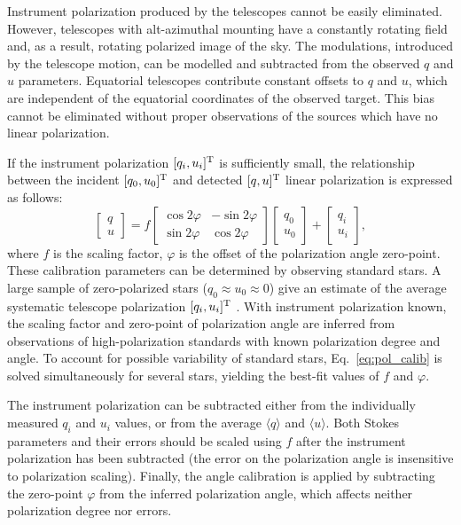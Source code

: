 Instrument polarization produced by the telescopes cannot be easily eliminated.
However, telescopes with alt-azimuthal mounting have a constantly rotating field and, as a result, rotating polarized image of the sky.
The modulations, introduced by the telescope motion, can be modelled and subtracted from the observed $q$ and $u$ parameters.
Equatorial telescopes contribute constant offsets to $q$ and $u$, which are independent of the equatorial coordinates of the observed target.
This bias cannot be eliminated without proper observations of the sources which have no linear polarization.

If the instrument polarization $[q_i, u_i]^{\mathrm{T}}$ is sufficiently small, the relationship between the incident $[q_0, u_0]^{\mathrm{T}}$ and detected $[q, u]^{\mathrm{T}}$  linear polarization is expressed as follows:
\begin{equation}
    \label{eq:pol_calib}
    \begin{bmatrix}
        q\\u
    \end{bmatrix} = f
    \begin{bmatrix}
        \cos 2\varphi & -\sin 2\varphi \\
        \sin 2\varphi & \cos 2\varphi
    \end{bmatrix}
    \begin{bmatrix}
        q_0\\ u_0
    \end{bmatrix} +
    \begin{bmatrix}
        q_i \\ u_i
    \end{bmatrix},
\end{equation}
where $f$ is the scaling factor, $\varphi$ is the offset of the polarization angle zero-point.
These calibration parameters can be determined by observing standard stars.
A large sample of zero-polarized stars ($q_0 \approx u_0 \approx 0$) give an estimate of the average systematic telescope polarization $[q_i, u_i]^{\mathrm{T}}$ \citep{Piirola2020}.
With instrument polarization known, the scaling factor and zero-point of polarization angle are inferred from observations of high-polarization standards with known polarization degree and angle.
To account for possible variability of standard stars, Eq.~\ref{eq:pol_calib} is solved simultaneously for several stars, yielding the best-fit values of $f$ and $\varphi$.

The instrument polarization can be subtracted either from the individually measured $q_i$ and $u_i$ values, or from the average $ \langle q \rangle $ and $ \langle u \rangle $.
Both Stokes parameters and their errors should be scaled using $f$ after the instrument polarization has been subtracted (the error on the polarization angle is insensitive to polarization scaling).
Finally, the angle calibration is applied by subtracting the zero-point $\varphi$ from the inferred polarization angle, which affects neither polarization degree nor errors.
